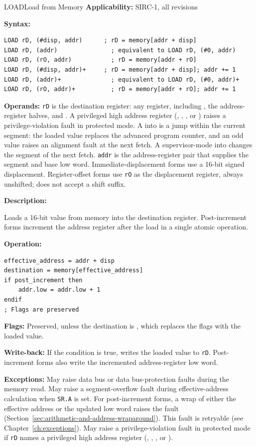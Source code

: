 \begin{instructionbox}{LOAD}{Load from Memory}
	\textbf{Applicability:} SIRC-1, all revisions

	\textbf{Syntax:}
	\begin{lstlisting}
LOAD rD, (#disp, addr)      ; rD = memory[addr + disp]
LOAD rD, (addr)               ; equivalent to LOAD rD, (#0, addr)
LOAD rD, (rO, addr)           ; rD = memory[addr + rO]
LOAD rD, (#disp, addr)+     ; rD = memory[addr + disp]; addr += 1
LOAD rD, (addr)+              ; equivalent to LOAD rD, (#0, addr)+
LOAD rD, (rO, addr)+          ; rD = memory[addr + rO]; addr += 1
\end{lstlisting}

	\textbf{Operands:} \texttt{rD} is the destination register: any register, including , the address-register halves, and . A privileged high address register
	(, , , or ) raises a privilege-violation fault in protected mode. A 
	into  is a jump within the current segment: the loaded value replaces the advanced program counter, and an odd
	value raises an alignment fault at the next fetch. A supervisor-mode  into  changes the segment of
	the next fetch. \texttt{addr} is the address-register pair that supplies the segment and base low word. Immediate-displacement forms use a 16-bit signed
	displacement. Register-offset forms use \texttt{rO} as the displacement register, always unshifted; 
	does not accept a shift suffix.

	\textbf{Description:}

	Loads a 16-bit value from memory into the destination register. Post-increment forms increment the address register
	after the load in a single atomic operation.

	\textbf{Operation:}
	\begin{verbatim}
effective_address = addr + disp
destination = memory[effective_address]
if post_increment then
    addr.low = addr.low + 1
endif
; Flags are preserved
\end{verbatim}

	\textbf{Flags:} Preserved, unless the destination is , which replaces the flags with the loaded value.

	\textbf{Write-back:} If the condition is true, writes the loaded value to \texttt{rD}. Post-increment forms also write
	the incremented address-register low word.

	\textbf{Exceptions:} May raise data bus or data bus-protection faults during the memory read. May raise a
	segment-overflow fault during effective-address calculation when \texttt{SR.A} is set. For post-increment forms, a
	wrap of either the effective address or the updated low word raises the fault (Section~\ref{sec:arithmetic-and-address-wraparound}).
	This fault is retryable (see Chapter~\ref{ch:exceptions}). May raise a privilege-violation fault in protected mode if
	\texttt{rD} names a privileged high address register (, , , or ).


\end{instructionbox}
